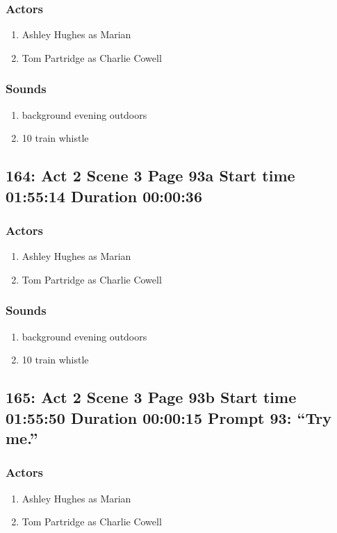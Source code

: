 \subsubsection{Actors}
\begin{enumerate}
\item Ashley Hughes as Marian
\item Tom Partridge as Charlie Cowell
\end{enumerate}

\subsubsection{Sounds}
\begin{enumerate}
\item background evening outdoors
\item 10 train whistle
\end{enumerate}
\subsection{164: Act 2 Scene 3 Page 93a Start time 01:55:14 Duration 00:00:36}

\subsubsection{Actors}
\begin{enumerate}
\item Ashley Hughes as Marian
\item Tom Partridge as Charlie Cowell
\end{enumerate}

\subsubsection{Sounds}
\begin{enumerate}
\item background evening outdoors
\item 10 train whistle
\end{enumerate}
\subsection{165: Act 2 Scene 3 Page 93b Start time 01:55:50 Duration 00:00:15 Prompt 93: ``Try me.''}

\subsubsection{Actors}
\begin{enumerate}
\item Ashley Hughes as Marian
\item Tom Partridge as Charlie Cowell
\end{enumerate}

